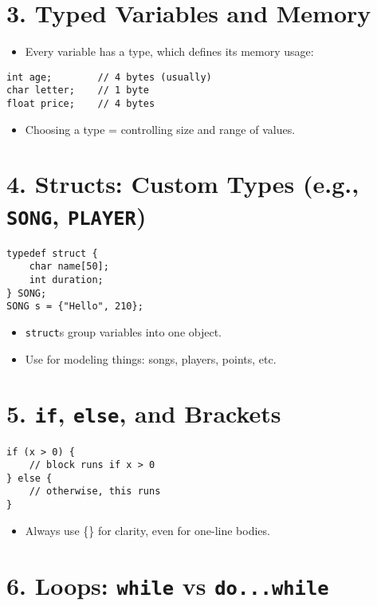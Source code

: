 \documentclass[12pt]{article}
\begin{document}
\section*{3. Typed Variables and Memory}

\begin{itemize}[noitemsep]
  \item Every variable has a type, which defines its memory usage:
\end{itemize}
\begin{lstlisting}
int age;        // 4 bytes (usually)
char letter;    // 1 byte
float price;    // 4 bytes
\end{lstlisting}
\begin{itemize}[noitemsep]
  \item Choosing a type = controlling size and range of values.
\end{itemize}

\section*{4. Structs: Custom Types (e.g., \texttt{SONG}, \texttt{PLAYER})}

\begin{lstlisting}
typedef struct {
    char name[50];
    int duration;
} SONG;
SONG s = {"Hello", 210};
\end{lstlisting}
\begin{itemize}[noitemsep]
  \item \texttt{struct}s group variables into one object.
  \item Use for modeling things: songs, players, points, etc.
\end{itemize}

\section*{5. \texttt{if}, \texttt{else}, and Brackets}

\begin{lstlisting}
if (x > 0) {
    // block runs if x > 0
} else {
    // otherwise, this runs
}
\end{lstlisting}
\begin{itemize}[noitemsep]
  \item Always use \{\} for clarity, even for one-line bodies.
\end{itemize}

\section*{6. Loops: \texttt{while} vs \texttt{do...while}}
\end{document}
